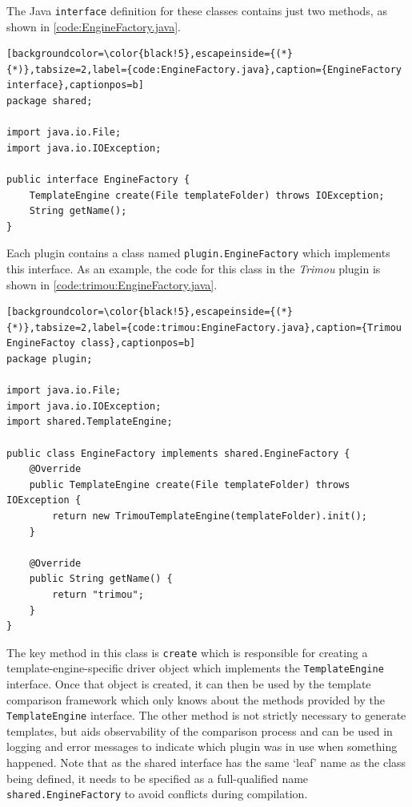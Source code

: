 The Java \verb!interface! definition for these classes contains just two methods, as shown in \autoref{code:EngineFactory.java}.

\begin{lstlisting}[backgroundcolor=\color{black!5},escapeinside={(*}{*)},tabsize=2,label={code:EngineFactory.java},caption={EngineFactory interface},captionpos=b]
package shared;

import java.io.File;
import java.io.IOException;

public interface EngineFactory {
    TemplateEngine create(File templateFolder) throws IOException;
    String getName();
}
\end{lstlisting}

Each plugin contains a class named \verb!plugin.EngineFactory! which implements this interface.  As an example, the code for this class in the \emph{Trimou} plugin is shown in \autoref{code:trimou:EngineFactory.java}.

\begin{lstlisting}[backgroundcolor=\color{black!5},escapeinside={(*}{*)},tabsize=2,label={code:trimou:EngineFactory.java},caption={Trimou EngineFactoy class},captionpos=b]
package plugin;

import java.io.File;
import java.io.IOException;
import shared.TemplateEngine;

public class EngineFactory implements shared.EngineFactory {
    @Override
    public TemplateEngine create(File templateFolder) throws IOException {
        return new TrimouTemplateEngine(templateFolder).init();
    }

    @Override
    public String getName() {
        return "trimou";
    }
}
\end{lstlisting}

The key method in this class is \verb!create! which is responsible for creating a template-engine-specific driver object which implements the \verb!TemplateEngine! interface. Once that object is created, it can then be used by the template comparison framework which only knows about the methods provided by the \verb!TemplateEngine! interface. The other method is not strictly necessary to generate templates, but aids observability of the comparison process and can be used in logging and error messages to indicate which plugin was in use when something happened. Note that as the shared interface has the same `leaf' name as the class being defined, it needs to be specified as a full-qualified name \verb!shared.EngineFactory! to avoid conflicts during compilation.

